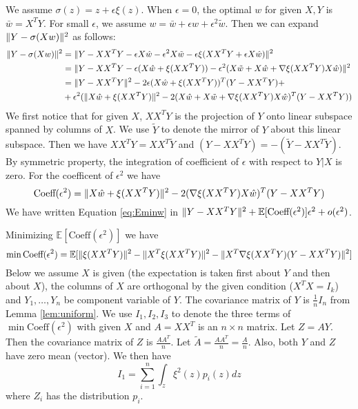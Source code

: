 \documentclass{article}
\DeclarePairedDelimiter\norm{\lVert}{\rVert}
\def\E{\mathbb{E}}
\begin{document}
We assume $\sigma(z) = z + \epsilon \xi(z)$. When $\epsilon = 0$, the optimal $w$ for given $X, Y$ is 
$\bar{w} = X^T Y $. For small $\epsilon$, we assume $ w = \bar{w} + \epsilon \hat{w} + \epsilon^2 \tilde{w}$. Then we can expand $\norm{Y - \sigma (X w ) }^2$ as follows:
\begin{align*}
\norm{Y - \sigma (X w ) }^2 & = \norm{Y - XX^T Y - \epsilon X \hat{w} - \epsilon^2 X \tilde{w} - \epsilon \xi(XX^T Y + \epsilon X\hat{w}) }^2 \\
& = \norm{ Y - XX^T Y - \epsilon (X\hat{w} + \xi(XX^T Y)) - \epsilon^2(X\tilde{w} + X\hat{w} + \nabla \xi(XX^TY)X\hat{w})}^2 \\
& = \norm{Y-XX^T Y }^2 - 2 \epsilon (X \hat{w} + \xi(XX^TY))^T (Y-XX^TY) +\\
& +\epsilon^2(\norm{X\hat{w} + \xi(XX^TY)}^2 - 2 (X\hat{w} + X \tilde{w}+ \nabla \xi(XX^TY)X\hat{w})^T(Y-XX^TY))
\end{align*}
We first notice that for given $X$, $XX^TY$ is the projection of $Y$ onto linear subspace spanned by columns of $X$. We use $\tilde{Y}$ to denote the mirror of $Y$ about this linear subspace. Then we have
$XX^T Y = XX^T \tilde{Y}$ and $(Y- XX^TY) = -(\tilde{Y} - XX^T \tilde{Y})$. By symmetric property, the integration of coefficient of $\epsilon$ with respect to $Y|X$ is zero. For the coefficent of $\epsilon^2$ we have
\begin{equation*}
\textrm{Coeff}(\epsilon^2)  =  \norm{X\hat{w} + \xi(XX^TY)}^2 - 2 (\nabla \xi(XX^TY)X\hat{w})^T(Y-XX^TY)
\end{equation*}
We have written Equation \eqref{eq:Eminw} in $ \norm{Y - X X^T Y}^2 + \E[\textrm{Coeff}(\epsilon^2)] \epsilon^2 + o(\epsilon^2)$.

Minimizing $\E[\textrm{Coeff}(\epsilon^2)]$ we have
\begin{equation}
\min \textrm{Coeff}(\epsilon^2) = \E[\norm{\xi(XX^TY)}^2 - \norm{X^T\xi(XX^TY)}^2 - \norm{X^T \nabla\xi(XX^TY)(Y-XX^TY)}^2]
\end{equation}
Below we assume $X$ is given (the expectation is taken first about $Y$ and then about $X$), the columns of $X$ are orthogonal by the given condition ($X^TX=I_k$) and $Y_1, \dots, Y_n $ be component variable of $Y$. The covariance matrix of $Y$ is $\frac{1}{n}I_n$ from Lemma \ref{lem:uniform}. We use $I_1, I_2, I_3$ to denote the three terms of $\min \textrm{Coeff}(\epsilon^2)$ with given $X$ and $A=XX^T$ is an $n\times n$ matrix. Let $Z = AY$. Then the covariance matrix of $Z$ is $\frac{AA^T}{n}$. Let $\widetilde{A} = \frac{AA^T}{n} = \frac{A}{n}$.  Also, both $Y$ and $Z$ have zero mean (vector). We then have
\begin{equation*}
I_1 = \sum_{i=1}^n \int_z \xi^2(z) p_i(z) dz
\end{equation*}
where $Z_i$ has the distribution $p_i$.
 
\end{document}
